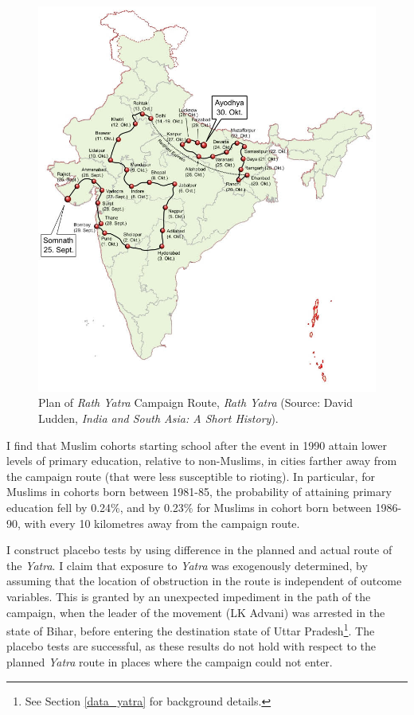 \documentclass{article}
\begin{document}
\begin{figure}[h!]
    \centering
    \includegraphics[scale=0.3]{images/plan_route.jpg}
    \caption{Plan of \emph{Rath Yatra} Campaign Route, \emph{Rath Yatra} (Source: David Ludden, \emph{India and South Asia: A Short History}).}
    \label{fig:route_p}
\end{figure}

I find that Muslim cohorts starting school after the event in 1990 attain lower levels of primary education, relative to non-Muslims, in cities farther away from the campaign route (that were less susceptible to rioting). In particular, for Muslims in cohorts born between 1981-85, the probability of attaining primary education fell by 0.24\%, and by 0.23\% for Muslims in cohort born between 1986-90, with every 10 kilometres away from the campaign route. 

I construct placebo tests by using difference in the planned and actual route of the \emph{Yatra}. I claim that exposure to \emph{Yatra} was exogenously determined, by assuming that the location of obstruction in the route is independent of outcome variables. This is granted by an unexpected impediment in the path of the campaign, when the leader of the movement (LK Advani) was arrested in the state of Bihar, before entering the destination state of Uttar Pradesh\footnote{See Section \ref{data_yatra} for background details.}. The placebo tests are successful, as these results do not hold with respect to the planned \textit{Yatra} route in places where the campaign could not enter.
\end{document}

